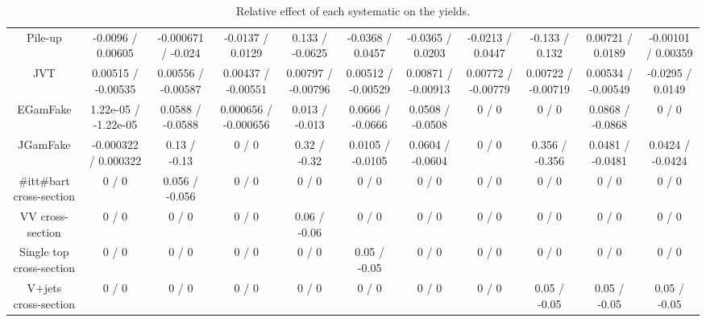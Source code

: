 \begin{table}[htbp]
\begin{center}
\begin{tabular}{|c|c|c|c|c|c|c|c|c|c|c|}
  Pile-up & -0.0096 / 0.00605 & -0.000671 / -0.024 & -0.0137 / 0.0129 & 0.133 / -0.0625 & -0.0368 / 0.0457 & -0.0365 / 0.0203 & -0.0213 / 0.0447 & -0.133 / 0.132 & 0.00721 / 0.0189 & -0.00101 / 0.00359 \\ 
  JVT & 0.00515 / -0.00535 & 0.00556 / -0.00587 & 0.00437 / -0.00551 & 0.00797 / -0.00796 & 0.00512 / -0.00529 & 0.00871 / -0.00913 & 0.00772 / -0.00779 & 0.00722 / -0.00719 & 0.00534 / -0.00549 & -0.0295 / 0.0149 \\ 
  EGamFake & 1.22e-05 / -1.22e-05 & 0.0588 / -0.0588 & 0.000656 / -0.000656 & 0.013 / -0.013 & 0.0666 / -0.0666 & 0.0508 / -0.0508 & 0 / 0 & 0 / 0 & 0.0868 / -0.0868 & 0 / 0 \\ 
  JGamFake & -0.000322 / 0.000322 & 0.13 / -0.13 & 0 / 0 & 0.32 / -0.32 & 0.0105 / -0.0105 & 0.0604 / -0.0604 & 0 / 0 & 0.356 / -0.356 & 0.0481 / -0.0481 & 0.0424 / -0.0424 \\ 
  #it{t#bar{t}} cross-section & 0 / 0 & 0.056 / -0.056 & 0 / 0 & 0 / 0 & 0 / 0 & 0 / 0 & 0 / 0 & 0 / 0 & 0 / 0 & 0 / 0 \\ 
  VV cross-section & 0 / 0 & 0 / 0 & 0 / 0 & 0.06 / -0.06 & 0 / 0 & 0 / 0 & 0 / 0 & 0 / 0 & 0 / 0 & 0 / 0 \\ 
  Single top cross-section & 0 / 0 & 0 / 0 & 0 / 0 & 0 / 0 & 0.05 / -0.05 & 0 / 0 & 0 / 0 & 0 / 0 & 0 / 0 & 0 / 0 \\ 
  V+jets cross-section & 0 / 0 & 0 / 0 & 0 / 0 & 0 / 0 & 0 / 0 & 0 / 0 & 0 / 0 & 0.05 / -0.05 & 0.05 / -0.05 & 0.05 / -0.05 \\ 
\hline 
\end{tabular} 
\caption{Relative effect of each systematic on the yields.} 
\end{center} 
\end{table} 
